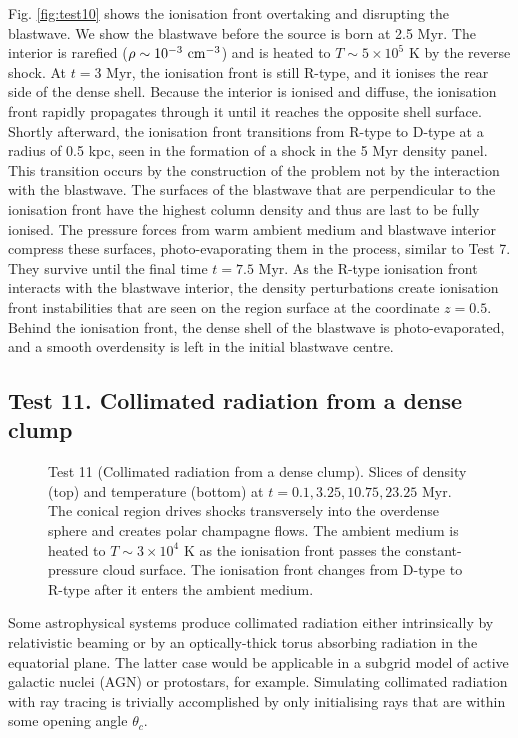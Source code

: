 \documentclass[useAMS,usenatbib]{mn2e}
\begin{document}
Fig. \ref{fig:test10} shows the ionisation front overtaking and
disrupting the blastwave.  We show the blastwave before the source is
born at 2.5 Myr.  The interior is rarefied ($\rho \sim
10^{-3}~\cubecm$) and is heated to $T \sim 5 \times 10^5$ K by the
reverse shock.  At $t = 3$ Myr, the ionisation front is still R-type,
and it ionises the rear side of the dense shell.  Because the interior
is ionised and diffuse, the ionisation front rapidly propagates
through it until it reaches the opposite shell surface.  Shortly
afterward, the ionisation front transitions from R-type to D-type at a
radius of 0.5 kpc, seen in the formation of a shock in the 5 Myr
density panel.  This transition occurs by the construction of the
problem not by the interaction with the blastwave.  The surfaces of
the blastwave that are perpendicular to the ionisation front have the
highest column density and thus are last to be fully ionised.  The
pressure forces from warm ambient medium and blastwave interior
compress these surfaces, photo-evaporating them in the process,
similar to Test 7.  They survive until the final time $t = 7.5$ Myr.
As the R-type ionisation front interacts with the blastwave interior,
the density perturbations create ionisation front instabilities
\citep{Whalen08_Instab} that are seen on the \hii region surface
at the coordinate $z=0.5$.  Behind the ionisation front, the dense
shell of the blastwave is photo-evaporated, and a smooth overdensity
is left in the initial blastwave centre.

\subsection{Test 11. Collimated radiation from a dense clump}

\begin{figure*}
  \caption{\label{fig:test11} Test 11 (Collimated radiation from a
    dense clump).  Slices of density (top) and temperature (bottom) at
    $t = 0.1, 3.25, 10.75, 23.25$ Myr.  The conical \hii region
    drives shocks transversely into the overdense sphere and creates
    polar champagne flows.  The ambient medium is heated to $T \sim 3
    \times 10^4$ K as the ionisation front passes the
    constant-pressure cloud surface.  The ionisation front changes
    from D-type to R-type after it enters the ambient medium.}
\end{figure*}

Some astrophysical systems produce collimated radiation either
intrinsically by relativistic beaming or by an optically-thick torus
absorbing radiation in the equatorial plane.  The latter case would be
applicable in a subgrid model of active galactic nuclei (AGN) or
protostars, for example.  Simulating collimated radiation with ray
tracing is trivially accomplished by only initialising rays that are
within some opening angle $\theta_c$.
\end{document}

